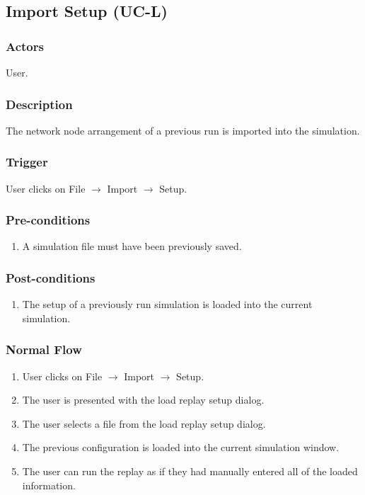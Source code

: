 \documentclass[a4paper,11pt,titlepage]{article}
\newcommand{\ra}{
  $\rightarrow$ \xspace
}
\begin{document}
\subsection{Import Setup (UC-L)}
\subsubsection{Actors}
User.
\subsubsection{Description}
The network node arrangement of a previous run is imported into the simulation.
\subsubsection{Trigger}
  User clicks on File \ra Import \ra Setup.
\subsubsection{Pre-conditions}

\begin{enumerate}
  \item A simulation file must have been previously saved.
\end{enumerate}

\subsubsection{Post-conditions}

\begin{enumerate}
  \item The setup of a previously run simulation is loaded into the current simulation.
\end{enumerate}

\subsubsection{Normal Flow}
\begin{enumerate}
  \item User clicks on File \ra Import \ra Setup.
  \item The user is presented with the load replay setup dialog.
  \item The user selects a file from the load replay setup dialog.
  \item The previous configuration is loaded into the current simulation window.
  \item The user can run the replay as if they had manually entered all of the loaded information.
\end{enumerate}
\end{document}
